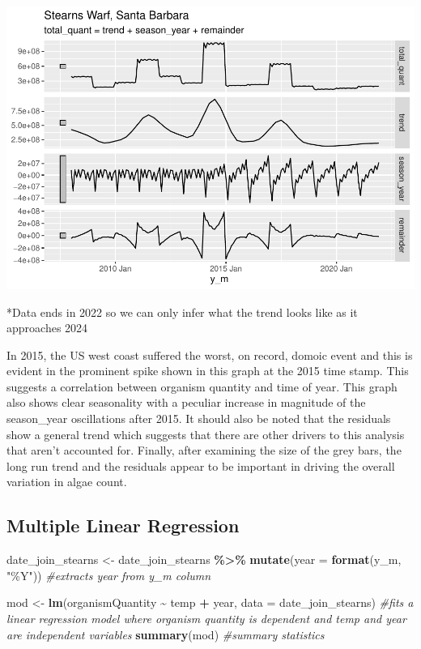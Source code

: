 \documentclass[
]{article}
\newenvironment{Shaded}{\begin{snugshade}}{\end{snugshade}}
\newcommand{\AttributeTok}[1]{\textcolor[rgb]{0.13,0.29,0.53}{#1}}
\newcommand{\CommentTok}[1]{\textcolor[rgb]{0.56,0.35,0.01}{\textit{#1}}}
\newcommand{\FunctionTok}[1]{\textcolor[rgb]{0.13,0.29,0.53}{\textbf{#1}}}
\newcommand{\NormalTok}[1]{#1}
\newcommand{\OtherTok}[1]{\textcolor[rgb]{0.56,0.35,0.01}{#1}}
\newcommand{\SpecialCharTok}[1]{\textcolor[rgb]{0.81,0.36,0.00}{\textbf{#1}}}
\newcommand{\StringTok}[1]{\textcolor[rgb]{0.31,0.60,0.02}{#1}}
\begin{document}
\includegraphics{algae_temp_analysis_files/figure-latex/unnamed-chunk-11-1.pdf}

*Data ends in 2022 so we can only infer what the trend looks like as it
approaches 2024

In 2015, the US west coast suffered the worst, on record, domoic event
and this is evident in the prominent spike shown in this graph at the
2015 time stamp. This suggests a correlation between organism quantity
and time of year. This graph also shows clear seasonality with a
peculiar increase in magnitude of the season\_year oscillations after
2015. It should also be noted that the residuals show a general trend
which suggests that there are other drivers to this analysis that aren't
accounted for. Finally, after examining the size of the grey bars, the
long run trend and the residuals appear to be important in driving the
overall variation in algae count.

\hypertarget{multiple-linear-regression}{%
\subsection{Multiple Linear
Regression}\label{multiple-linear-regression}}

\begin{Shaded}
\begin{Highlighting}[]
\NormalTok{date\_join\_stearns }\OtherTok{\textless{}{-}}\NormalTok{ date\_join\_stearns }\SpecialCharTok{\%\textgreater{}\%}
  \FunctionTok{mutate}\NormalTok{(}\AttributeTok{year =} \FunctionTok{format}\NormalTok{(y\_m, }\StringTok{"\%Y"}\NormalTok{)) }\CommentTok{\#extracts year from y\_m  column}

\NormalTok{mod }\OtherTok{\textless{}{-}} \FunctionTok{lm}\NormalTok{(organismQuantity }\SpecialCharTok{\textasciitilde{}}\NormalTok{ temp }\SpecialCharTok{+}\NormalTok{ year, }\AttributeTok{data =}\NormalTok{ date\_join\_stearns) }\CommentTok{\#fits a linear regression model where organism quantity is dependent and temp and year are independent variables }
\FunctionTok{summary}\NormalTok{(mod) }\CommentTok{\#summary statistics}
\end{Highlighting}
\end{Shaded}
\end{document}
